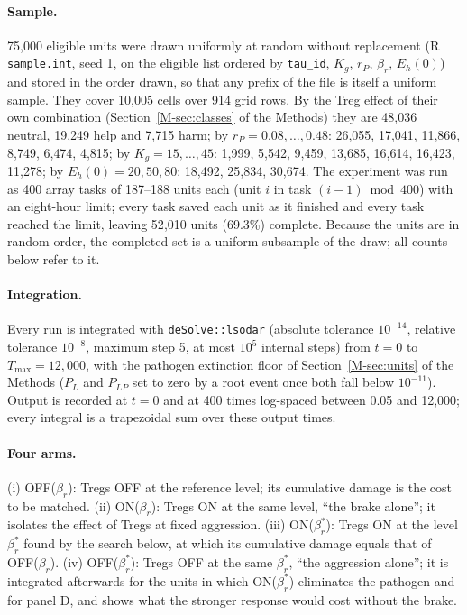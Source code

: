 \documentclass[11pt]{article}
\begin{document}
\paragraph{Sample.} 75{,}000 eligible units were drawn uniformly at random without replacement
(R \texttt{sample.int}, seed 1, on the eligible list ordered by \texttt{tau\_id}, $K_g$,
$r_P$, $\beta_r$, $E_h(0)$) and stored in the order drawn, so that any prefix of the file
is itself a uniform sample. They cover 10{,}005 cells over 914 grid rows. By the Treg
effect of their own combination (Section~\ref{M-sec:classes} of the Methods) they are 48{,}036 neutral, 19{,}249
help and 7{,}715 harm; by $r_P = 0.08, \dots, 0.48$: 26{,}055, 17{,}041, 11{,}866, 8{,}749,
6{,}474, 4{,}815; by $K_g = 15, \dots, 45$: 1{,}999, 5{,}542, 9{,}459, 13{,}685, 16{,}614, 16{,}423,
11{,}278; by $E_h(0) = 20, 50, 80$: 18{,}492, 25{,}834, 30{,}674. The experiment was run as
400 array tasks of 187--188 units each (unit $i$ in task $(i-1) \bmod 400$) with an eight-hour
limit; every task saved each unit as it finished and every task reached the limit, leaving
52{,}010 units (69.3\%) complete. Because the units are in random order, the completed set is a
uniform subsample of the draw; all counts below refer to it.

\paragraph{Integration.} Every run is integrated with \texttt{deSolve::lsodar} (absolute
tolerance $10^{-14}$, relative tolerance $10^{-8}$, maximum step 5, at most $10^5$ internal
steps) from $t = 0$ to $T_{\max} = 12{,}000$, with the pathogen extinction floor of
Section~\ref{M-sec:units} of the Methods ($P_L$ and $P_{LP}$ set to zero by a root event once both fall below
$10^{-11}$). Output is recorded at $t = 0$ and at 400 times log-spaced between 0.05 and
12{,}000; every integral is a trapezoidal sum over these output times.

\paragraph{Four arms.} (i) OFF($\beta_r$): Tregs OFF at the reference level; its cumulative
damage is the cost to be matched. (ii) ON($\beta_r$): Tregs ON at the same level, ``the brake
alone''; it isolates the effect of Tregs at fixed aggression.
(iii) ON($\beta_r^{*}$): Tregs ON at the level $\beta_r^{*}$ found by the search below, at which
its cumulative damage equals that of OFF($\beta_r$). (iv) OFF($\beta_r^{*}$): Tregs OFF at the
same $\beta_r^{*}$, ``the aggression alone''; it is integrated afterwards for the units in which
ON($\beta_r^{*}$) eliminates the pathogen and for panel D, and shows what the stronger response
would cost without the brake.
\end{document}
